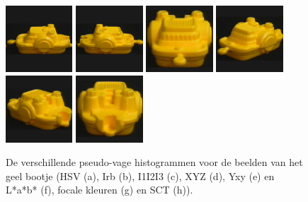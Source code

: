 \begin{figure}[bp]
\caption{\label{fig:alle_histn_geel_bootje}De verschillende pseudo-vage histogrammen voor de beelden 
van het geel bootje (HSV (a), Irb (b), I1I2I3 (c), XYZ (d), Yxy (e) en L*a*b* (f), focale kleuren (g) en SCT (h)).}
\vspace{5pt}
\centering
\includegraphics[width=2.5cm]{coil/beeld-12.eps}
\includegraphics[width=2.5cm]{coil/beeld-13.eps}
\includegraphics[width=2.5cm]{coil/beeld-14.eps}
\includegraphics[width=2.5cm]{coil/beeld-15.eps}
\includegraphics[width=2.5cm]{coil/beeld-16.eps}
\includegraphics[width=2.5cm]{coil/beeld-17.eps}\\[4pt]
\vspace{3pt}
\end{figure}

